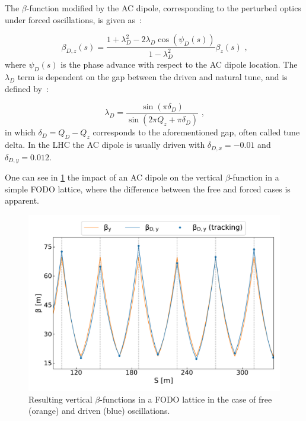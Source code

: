 The \(\beta\)-function modified by the AC dipole, corresponding to the perturbed optics under forced oscillations, is given as~\cite{PRAB:Miyamoto:Parametrization_Driven_Betatron_Oscillation}:

\begin{equation}
  \beta_{D,z}(s) = \frac{1 + \lambda_D^2 - 2 \lambda_D \cos \left(\psi_D(s)\right)}{1 - \lambda_D^2} \beta_z(s) \text{ ,}
  \label{equation:driven_beta_function}
\end{equation}
where \(\psi_D(s)\) is the phase advance with respect to the AC dipole location.
The \(\lambda_D\) term is dependent on the gap between the driven and natural tune, and is defined by~\cite{PRAB:Miyamoto:Parametrization_Driven_Betatron_Oscillation}:

\begin{equation}
  \lambda_D = \frac{\sin \left(\pi \delta_D \right)}{\sin \left(2 \pi Q_z + \pi \delta_D \right)} \text{ ,}
  \label{equation:driven_oscillations_lambda_D}
\end{equation}
in which \(\delta_D = Q_D - Q_z\) corresponds to the aforementioned gap, often called tune delta.
In the LHC the AC dipole is usually driven with \(\delta_{D,x} = -0.01\) and \(\delta_{D,y} = 0.012\).

One can see in \cref{figure:acdipole_beta_functions_vs_nominal} the impact of an AC dipole on the vertical \(\beta\)-function in a simple FODO lattice, where the difference between the free and forced cases is apparent.

\begin{figure}[!htb]
  \centering
  \includegraphics*[width=0.99\linewidth]{Figures/Optics_Measurements_Corrections_at_LHC/betas_nominal_vs_driven.pdf}
  \caption{Resulting vertical \(\beta\)-functions in a FODO lattice in the case of free (\textcolor{mplorange}{orange}) and driven (\textcolor{mplblue}{blue}) oscillations.}
  \label{figure:acdipole_beta_functions_vs_nominal}
\end{figure}

